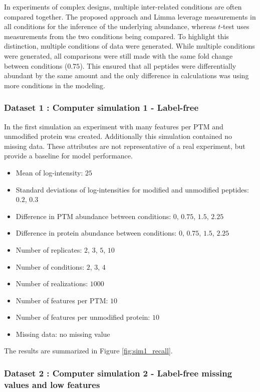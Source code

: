 \documentclass{mcp}
\begin{document}
In experiments of complex designs, multiple inter-related conditions are often compared together. The proposed approach and Limma leverage measurements in all conditions for the inference of the underlying abundance, whereas $t$-test uses measurements from the two conditions being compared. To highlight this distinction, multiple conditions of data were generated. While multiple conditions were generated, all comparisons were still made with the same fold change between conditions ($0.75$). This ensured that all peptides were differentially abundant by the same amount and the only difference in calculations was using more conditions in the modeling.

\subsubsection{Dataset 1 : Computer simulation 1 - Label-free}
\label{sec:dataset1}
In the first simulation an experiment with many features per PTM and unmodified protein was created. Additionally this simulation contained no missing data. These attributes are not representative of a real experiment, but provide a baseline for model performance.

\begin{itemize}
\item Mean of log-intensity: $25$
\item Standard deviations of log-intensities for modified and unmodified peptides: $0.2$, $0.3$
\item Difference in PTM abundance between conditions: $0$, $0.75$, $1.5$, $2.25$
\item Difference in protein abundance between conditions: $0$, $0.75$, $1.5$, $2.25$
\item Number of replicates: $2$, $3$, $5$, $10$
\item Number of conditions: $2$, $3$, $4$
\item Number of realizations: $1000$
\item Number of features per PTM: $10$
\item Number of features per unmodified protein: $10$
\item Missing data: no missing value
\end{itemize}

The results are summarized in Figure \ref{fig:sim1_recall}.

\subsubsection{Dataset 2 : Computer simulation 2 - Label-free missing values and low features}
\label{sec:dataset2}
\end{document}
